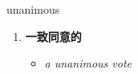 
\begin{frame}
{\huge unanimous}
\begin{center}
\begin{enumerate}\Large
  \item \textbf{一致同意的}
  \begin{itemize}
    \item \em{\Large{a unanimous vote}}
  \end{itemize}
\end{enumerate}
\end{center}
\end{frame}
